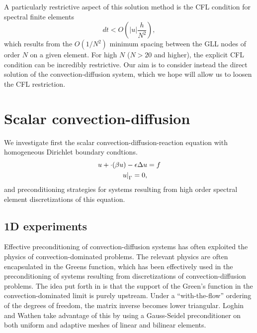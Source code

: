 \documentclass[final,leqno]{siamltex}
\newcommand{\LRp}[1]{\left( #1 \right)}
\newcommand{\LRb}[1]{\left| #1 \right|}
\let\grad\relax
\newcommand{\grad}{\nabla}
\renewcommand{\div}{\grad \cdot}
\begin{document}
A particularly restrictive aspect of this solution method is the CFL condition for spectral finite elements
\[
dt < O\LRp{\LRb{u}\frac{h}{N^2}},
\]
which results from the $O(1/N^2)$ minimum spacing between the GLL nodes of order $N$ on a given element.  For high $N$ ($N>20$ and higher), the explicit CFL condition can be incredibly restrictive.  Our aim is to consider instead the direct solution of the convection-diffusion system, which we hope will allow us to loosen the CFL restriction.  

\section{Scalar convection-diffusion}

We investigate first the scalar convection-diffusion-reaction equation with homogeneous Dirichlet boundary condtions.  
\begin{align*}
u + \div(\beta u) - \epsilon \Delta u &= f\\
\left.u\right|_{\Gamma} = 0,
\end{align*}
and preconditioning strategies for systems resulting from high order spectral element discretizations of this equation.  

\subsection{1D experiments}

Effective preconditioning of convection-diffusion systems has often exploited the physics of convection-dominated problems.  The relevant physics are often encapsulated in the Greens function, which has been effectively used in the preconditioning of systems resulting from discretizations of convection-diffusion problems.  The idea put forth in \cite{Loghin97,Loghin99} is that the support of the Green's function in the convection-dominated limit is purely upstream.  Under a ``with-the-flow'' ordering of the degrees of freedom, the matrix inverse becomes lower triangular.  Loghin and Wathen take advantage of this by using a Gauss-Seidel preconditioner on both uniform and adaptive meshes of linear and bilinear elements.  
\end{document}
